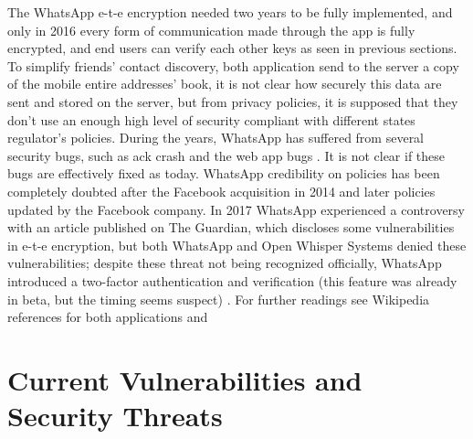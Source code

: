 \documentclass{article}
\begin{document}
The WhatsApp e-t-e encryption needed two years to be fully implemented, and only in 2016 every form of communication made through the app is fully encrypted, and end users can verify each other keys as seen in previous sections.\newline
To simplify friends' contact discovery, both application send to the server a copy of the mobile entire addresses' book, it is not clear how securely this data are sent and stored on the server, but from privacy policies, it is supposed that they don't use an enough high level of security compliant with different states regulator's policies.\newline 
During the years, WhatsApp has suffered from several security bugs, such as ack crash \cite{ack_crash} and the web app bugs \cite{what_web}. It is not clear if these bugs are effectively fixed as today.\newline
WhatsApp credibility on policies has been completely doubted after the Facebook acquisition in 2014 and later policies updated by the Facebook company.\newline
In 2017 WhatsApp experienced a controversy with an article published on The Guardian, which discloses some vulnerabilities in e-t-e encryption, but both WhatsApp and Open Whisper Systems denied these vulnerabilities; despite these threat not being recognized officially, WhatsApp introduced a two-factor authentication and verification (this feature was already in beta, but the timing seems suspect) \cite{what_threat}.\newline
For further readings see Wikipedia references for both applications \cite{tel_wiki} and \cite{what_wiki}


\section{Current Vulnerabilities and Security Threats}
\end{document}
